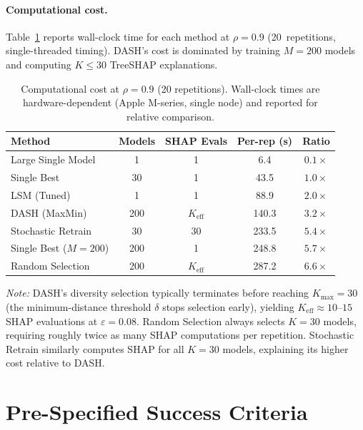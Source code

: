 \documentclass[11pt]{article}
\newcommand{\dash}{\textsc{DASH}}
\newcommand{\rhovar}{\rho}
\begin{document}
\paragraph{Computational cost.}
Table~\ref{tab:cost} reports wall-clock time for each method at
$\rhovar = 0.9$ (20~repetitions, single-threaded timing).
\dash{}'s cost is dominated by training $M = 200$ models and computing
$K \leq 30$ TreeSHAP explanations.

\begin{table}[htbp]
\centering
\caption{Computational cost at $\rhovar = 0.9$ (20 repetitions).
Wall-clock times are hardware-dependent (Apple M-series, single node)
and reported for relative comparison.}
\label{tab:cost}
\small
\begin{tabular}{lcccc}
\toprule
\textbf{Method} & \textbf{Models} & \textbf{SHAP Evals} & \textbf{Per-rep (s)} & \textbf{Ratio} \\
\midrule
Large Single Model & 1  & 1  & \phantom{00}6.4 & $0.1\times$ \\
Single Best       & 30  & 1  & \phantom{0}43.5 & $1.0\times$ \\
LSM (Tuned)       & 1   & 1  & \phantom{0}88.9 & $2.0\times$ \\
\dash{} (MaxMin)  & 200 & $K_{\text{eff}}$ & 140.3 & $3.2\times$ \\
Stochastic Retrain & 30 & 30 & 233.5 & $5.4\times$ \\
Single Best ($M{=}200$)  & 200 & 1  & 248.8 & $5.7\times$ \\
Random Selection  & 200 & $K_{\text{eff}}$ & 287.2 & $6.6\times$ \\
\bottomrule
\end{tabular}
\smallskip

\noindent\textit{Note:} \dash{}'s diversity selection typically terminates
before reaching $K_{\max} = 30$ (the minimum-distance threshold $\delta$
stops selection early), yielding $K_{\text{eff}} \approx 10$--$15$ SHAP
evaluations at $\varepsilon = 0.08$. Random Selection always selects
$K = 30$ models, requiring roughly twice as many SHAP computations per
repetition. Stochastic Retrain similarly computes SHAP for all $K = 30$
models, explaining its higher cost relative to \dash{}.
\end{table}

\section{Pre-Specified Success Criteria}
\label{app:criteria}
\end{document}
